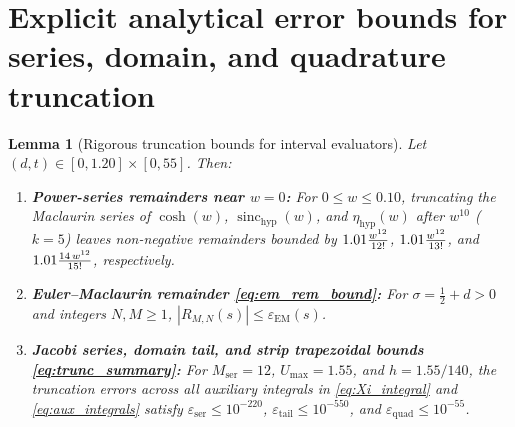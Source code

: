 \documentclass[11pt,a4paper,reqno]{amsart}
\newtheorem{lemma}[theorem]{Lemma}
\theoremstyle{definition}
\theoremstyle{remark}
\numberwithin{equation}{section}
\newcommand{\sinch}{\operatorname{sinc}_{\mathrm{hyp}}}
\newcommand{\etah}{\eta_{\mathrm{hyp}}}
\newcommand{\fac}{\mathclose{\mathchar"0021}}
\begin{document}
\appendix

\section{Explicit analytical error bounds for series, domain, and quadrature truncation}\label{app:bounds}

\begin{lemma}[Rigorous truncation bounds for interval evaluators]\label{lem:app_bounds}
Let $(d,t) \in [0, 1.20] \times [0, 55]$. Then:
\begin{enumerate}
\item[\textup{(a)}] \textbf{Power-series remainders near $w = 0$:} For $0 \le w \le 0.10$, truncating the Maclaurin series of $\cosh(w)$, $\sinch(w)$, and $\etah(w)$ after $w^{10}$ ($k = 5$) leaves non-negative remainders bounded by $1.01\frac{w^{12}}{12\fac}$, $1.01\frac{w^{12}}{13\fac}$, and $1.01\frac{14\,w^{12}}{15\fac}$, respectively.
\item[\textup{(b)}] \textbf{Euler--Maclaurin remainder \eqref{eq:em_rem_bound}:} For $\sigma = \frac{1}{2}+d > 0$ and integers $N, M \ge 1$, $|R_{M,N}(s)| \le \varepsilon_{\mathrm{EM}}(s)$.
\item[\textup{(c)}] \textbf{Jacobi series, domain tail, and strip trapezoidal bounds \eqref{eq:trunc_summary}:} For $M_{\mathrm{ser}} = 12$, $U_{\max} = 1.55$, and $h = 1.55/140$, the truncation errors across all auxiliary integrals in \eqref{eq:Xi_integral} and \eqref{eq:aux_integrals} satisfy $\varepsilon_{\mathrm{ser}} \le 10^{-220}$, $\varepsilon_{\mathrm{tail}} \le 10^{-550}$, and $\varepsilon_{\mathrm{quad}} \le 10^{-55}$.
\end{enumerate}
\end{lemma}
\end{document}
